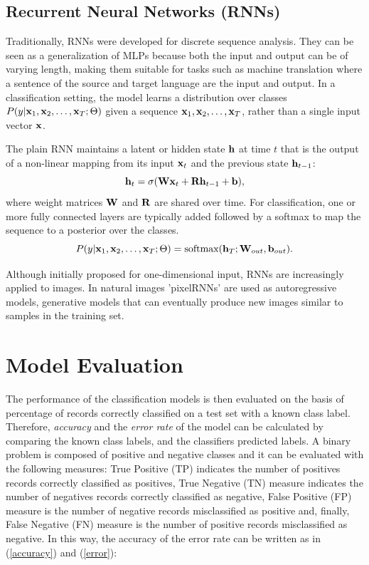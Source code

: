 \subsection{Recurrent Neural Networks (RNNs)}
\label{sec:rnns}
Traditionally, RNNs were developed for discrete sequence analysis. They can be seen as a generalization of MLPs because both the input and output can be of varying length, making them suitable for tasks such as machine translation where a sentence of the source and target language are the input and output. In a classification setting, the model learns a distribution over classes $P(y | {\bf x}_{1}, {\bf x}_{2}, \ldots, {\bf x}_{T}; \Theta)$ given a sequence ${\bf x}_{1}, {\bf x}_{2}, \ldots, {\bf x}_{T}$, rather than a single input vector ${\bf x}$.

The plain RNN maintains a latent or hidden state ${\bf h}$ at time $t$ that is the output of a non-linear mapping from its input ${\bf x}_{t}$ and the previous state ${\bf h}_{t-1}$:
\begin{equation}
{\bf h}_{t} = \sigma({\bf W}{\bf x}_{t} + {\bf R}{\bf h}_{t - 1} + {\bf b}),
\end{equation}
where weight matrices ${\bf W}$ and ${\bf R}$ are shared over time. For classification, one or more fully connected layers are typically added followed by a softmax to map the sequence to a posterior over the classes. 
\begin{equation}
P(y | {\bf x}_{1}, {\bf x}_{2}, \ldots, {\bf x}_{T}; \Theta) = \text{softmax}( {\bf h}_{T}; {\bf W}_{out}, {\bf b}_{out}).
\end{equation}

Although initially proposed for one-dimensional input, RNNs are increasingly applied to images. In natural images 'pixelRNNs' are used as autoregressive models, generative models that can eventually produce new images similar to samples in the training set. 

\section{Model Evaluation} \label{ME} %
The performance of the classification models is then evaluated on the basis of percentage of records correctly classified on a test set with a known class label. Therefore, \textit{accuracy} and the \textit{error rate} of the model can be calculated by comparing the known class labels, and the classifiers predicted labels. A binary problem is composed of positive and negative classes and it can be evaluated with the following measures: True Positive (\acs{TP}) indicates the number of positives records correctly classified as positives, True Negative (\acs{TN}) measure indicates the number of negatives records correctly classified as negative, False Positive (\acs{FP}) measure is the number of negative records misclassified as positive and, finally, False Negative (\acs{FN}) measure is the number of positive records misclassified as negative. In this way, the accuracy of the error rate can be written as in (\ref{accuracy}) and (\ref{error}):

